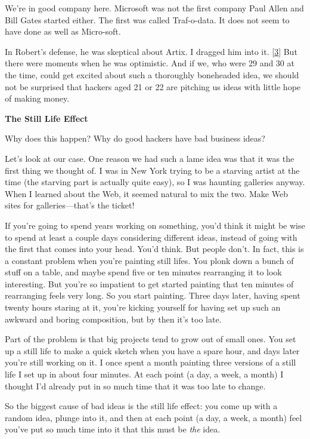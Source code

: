 We're in good company here. Microsoft was not the first company Paul
Allen and Bill Gates started either. The first was called Traf-o-data.
It does not seem to have done as well as Micro-soft.

In Robert's defense, he was skeptical about Artix. I dragged him into
it. {[}\hyperref[f3n]{3}{]} But there were moments when he was
optimistic. And if we, who were 29 and 30 at the time, could get excited
about such a thoroughly boneheaded idea, we should not be surprised that
hackers aged 21 or 22 are pitching us ideas with little hope of making
money.

\textbf{The Still Life Effect}

Why does this happen? Why do good hackers have bad business ideas?

Let's look at our case. One reason we had such a lame idea was that it
was the first thing we thought of. I was in New York trying to be a
starving artist at the time (the starving part is actually quite easy),
so I was haunting galleries anyway. When I learned about the Web, it
seemed natural to mix the two. Make Web sites for galleries---that's the
ticket!

If you're going to spend years working on something, you'd think it
might be wise to spend at least a couple days considering different
ideas, instead of going with the first that comes into your head. You'd
think. But people don't. In fact, this is a constant problem when you're
painting still lifes. You plonk down a bunch of stuff on a table, and
maybe spend five or ten minutes rearranging it to look interesting. But
you're so impatient to get started painting that ten minutes of
rearranging feels very long. So you start painting. Three days later,
having spent twenty hours staring at it, you're kicking yourself for
having set up such an awkward and boring composition, but by then it's
too late.

Part of the problem is that big projects tend to grow out of small ones.
You set up a still life to make a quick sketch when you have a spare
hour, and days later you're still working on it. I once spent a month
painting three versions of a still life I set up in about four minutes.
At each point (a day, a week, a month) I thought I'd already put in so
much time that it was too late to change.

So the biggest cause of bad ideas is the still life effect: you come up
with a random idea, plunge into it, and then at each point (a day, a
week, a month) feel you've put so much time into it that this must be
\emph{the} idea.

